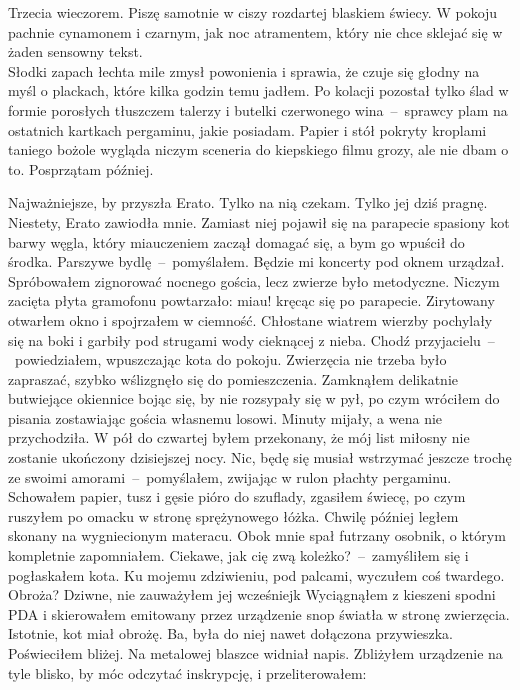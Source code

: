 \documentclass[../MAIN.tex]{subfiles}
\begin{document}
Trzecia wieczorem. Piszę samotnie w ciszy rozdartej blaskiem
świecy. W pokoju pachnie cynamonem i czarnym, jak noc
atramentem, który nie chce sklejać się w żaden sensowny tekst.
\\
Słodki zapach łechta mile zmysł powonienia i sprawia, że czuje
się głodny na myśl o plackach, które kilka godzin temu jadłem.
Po kolacji pozostał tylko ślad w formie porosłych tłuszczem
talerzy i butelki czerwonego wina~--~sprawcy plam na ostatnich
kartkach pergaminu, jakie posiadam. Papier i stół pokryty
kroplami taniego bożole wygląda niczym sceneria do kiepskiego
filmu grozy, ale nie dbam o to. Posprzątam \mbox{później}.

Najważniejsze, by przyszła Erato. Tylko na nią czekam. Tylko
jej dziś pragnę. Niestety, Erato zawiodła mnie. Zamiast niej
pojawił się na parapecie spasiony kot barwy węgla, który
miauczeniem zaczął domagać się, a bym go wpuścił do środka.
Parszywe bydlę~--~pomyślałem. Będzie mi koncerty pod oknem
urządzał. Spróbowałem zignorować nocnego gościa, lecz zwierze
było metodyczne. Niczym zacięta płyta gramofonu powtarzało:
miau! kręcąc się po parapecie. Zirytowany otwarłem okno i
spojrzałem w ciemność. Chłostane wiatrem wierzby pochylały się
na boki i garbiły pod strugami wody cieknącej z nieba. Chodź
przyjacielu~--~powiedziałem, wpuszczając kota do pokoju.
Zwierzęcia nie trzeba było zapraszać, szybko wślizgnęło się do
pomieszczenia. Zamknąłem delikatnie butwiejące okiennice bojąc
się, by nie rozsypały się w pył, po czym wróciłem do pisania
zostawiając gościa własnemu losowi. Minuty mijały, a wena nie
przychodziła. W pół do czwartej byłem przekonany, że mój list
miłosny nie zostanie ukończony dzisiejszej nocy. Nic, będę się
musiał wstrzymać jeszcze trochę ze swoimi
amorami~--~pomyślałem, zwijając w rulon płachty pergaminu.
Schowałem papier, tusz i gęsie pióro do szuflady, zgasiłem
świecę, po czym ruszyłem po omacku w stronę sprężynowego łóżka.
Chwilę później ległem skonany na wygniecionym materacu. Obok
mnie spał futrzany osobnik, o którym kompletnie zapomniałem.
Ciekawe, jak cię zwą koleżko?~--~zamyśliłem się i pogłaskałem
kota. Ku mojemu zdziwieniu, pod palcami, wyczułem coś twardego.
Obroża? Dziwne, nie zauważyłem jej wcześniej\3k Wyciągnąłem z
kieszeni spodni PDA i skierowałem emitowany przez urządzenie
snop światła w stronę zwierzęcia. Istotnie, kot miał obrożę.
Ba, była do niej nawet dołączona przywieszka. Poświeciłem
bliżej. Na metalowej blaszce widniał napis. Zbliżyłem
urządzenie na tyle blisko, by móc odczytać inskrypcję, i
przeliterowałem:
\end{document}
